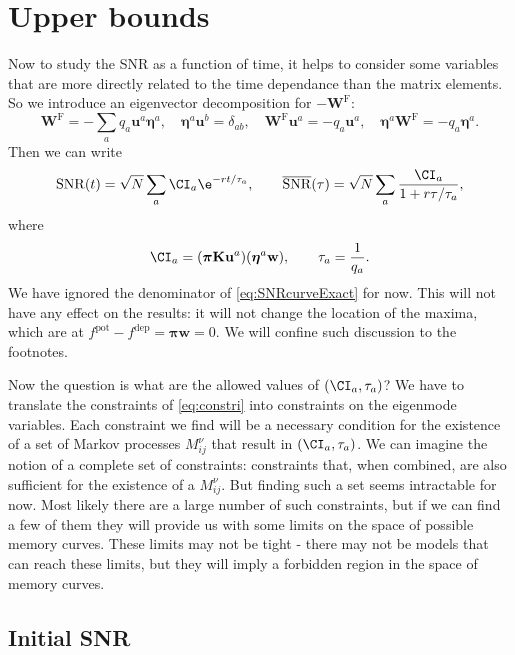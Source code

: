 \documentclass[12pt]{article}
\newcommand{\eqm}{\pi}
\newcommand{\eq}{\boldsymbol{\eqm}}
\newcommand{\wm}{w}
\newcommand{\w}{\mathbf{\wm}}
\newcommand{\Wm}{W}
\newcommand{\W}{\mathbf{\Wm}}
\newcommand{\MMdm}{M}
\newcommand{\encm}{K}
\newcommand{\enc}{\mathbf{\encm}}
\newcommand{\frg}{\W^{\mathrm{F}}}
\newcommand{\evrm}{u}
\newcommand{\evr}{\mathbf{\evrm}}
\newcommand{\evlm}{\eta}
\newcommand{\evl}{\boldsymbol{\evlm}}
\newcommand{\pot}{^{\text{pot}}}
\newcommand{\dep}{^{\text{dep}}}
\DeclareMathOperator{\snr}{SNR}
\newcommand{\snrb}{\overline{\snr}}
\begin{document}
\section{Upper bounds}\label{sec:upperbnds}

Now to study the SNR as a function of  time, it helps to consider some variables that are more directly related to the time dependance than the matrix elements. 
So we introduce an eigenvector decomposition for \(-\frg\):
%
\begin{equation}\label{eq:eigendecomp}
  \frg = - \sum_a q_a \evr^a \evl^a,
  \quad
  \evl^a \evr^b = \delta_{ab},
  \quad
  \frg \evr^a = -q_a \evr^a,
  \quad
  \evl^a \frg = -q_a \evl^a.
\end{equation}
%
Then we can write
%
\begin{equation}\label{eq:snreig}
  \snr(t) = \sqrt{N}\sum_a \CI_a \e^{-rt/\tau_a},
  \qquad
  \snrb(\tau) = \sqrt{N}\sum_a \frac{\CI_a}{1+r\tau/\tau_a},
\end{equation}
%
where
%
\begin{equation}\label{eq:snrcoeffs}
  \CI_a = (\eq \enc \evr^a) (\evl^a \w),
  \qquad
  \tau_a = \frac{1}{q_a}.
\end{equation}
%
We have ignored the denominator of \cref{eq:SNRcurveExact} for now.
This will not have any effect on the results: it will not change the location of the maxima, which are at \( f\pot - f\dep = \eq \w = 0 \).
We will confine such discussion to the footnotes.

Now the question is what are the allowed values of \( (\CI_a, \tau_a) \)?
We have to translate the constraints of \cref{eq:constri} into constraints on the eigenmode variables.
Each constraint we find will be a necessary condition for the existence of a set of Markov processes \( \MMdm_{ij}^\nu \) that result in \( (\CI_a, \tau_a) \).
We can imagine the notion of a complete set of constraints: constraints that, when combined, are also sufficient for the existence of a \( \MMdm_{ij}^\nu \).
But finding such a set seems intractable for now.
Most likely there are a large number of such constraints, but if we can find a few of them they will provide us with some limits on the space of possible memory curves.
These limits may not be tight - there may not be models that can reach these limits, but they will imply a forbidden region in the space of memory curves.



\subsection{Initial SNR}\label{sec:initial}
\end{document}
